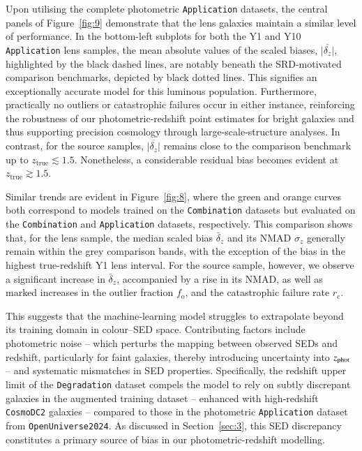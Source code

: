 Upon utilising the complete photometric \texttt{Application} datasets, the central panels of Figure~\ref{fig:9} demonstrate that the lens galaxies maintain a similar level of performance. In the bottom-left subplots for both the Y1 and Y10 \texttt{Application} lens samples, the mean absolute values of the scaled biases, \(\overline{\left|\delta_z\right|}\), highlighted by the black dashed lines, are notably beneath the SRD-motivated comparison benchmarks, depicted by black dotted lines. This signifies an exceptionally accurate model for this luminous population. Furthermore, practically no outliers or catastrophic failures occur in either instance, reinforcing the robustness of our photometric-redshift point estimates for bright galaxies and thus supporting precision cosmology through large-scale-structure analyses. In contrast, for the source samples, \(\overline{\left|\delta_z\right|}\) remains close to the comparison benchmark up to \(z_\mathrm{true} \lesssim 1.5\). Nonetheless, a considerable residual bias becomes evident at \(z_\mathrm{true} \gtrsim 1.5\).

Similar trends are evident in Figure~\ref{fig:8}, where the green and orange curves both correspond to models trained on the \texttt{Combination} datasets but evaluated on the \texttt{Combination} and \texttt{Application} datasets, respectively. This comparison shows that, for the lens sample, the median scaled bias \(\bar{\delta}_z\) and its NMAD \(\sigma_z\) generally remain within the grey comparison bands, with the exception of the bias in the highest true-redshift Y1 lens interval. For the source sample, however, we observe a significant increase in \(\bar{\delta}_z\), accompanied by a rise in its NMAD, as well as marked increases in the outlier fraction \(f_{\mathrm{o}}\), and the catastrophic failure rate \(r_{\mathrm{c}}\).

This suggests that the machine‐learning model struggles to extrapolate beyond its training domain in colour–SED space. Contributing factors include photometric noise -- which perturbs the mapping between observed SEDs and redshift, particularly for faint galaxies, thereby introducing uncertainty into \(z_{\rm phot}\) -- and systematic mismatches in SED properties. Specifically, the redshift upper limit of the \texttt{Degradation} dataset compels the model to rely on subtly discrepant galaxies in the augmented training dataset -- enhanced with high-redshift \texttt{CosmoDC2} galaxies -- compared to those in the photometric \texttt{Application} dataset from \texttt{OpenUniverse2024}. As discussed in Section~\ref{sec:3}, this SED discrepancy constitutes a primary source of bias in our photometric-redshift modelling.

